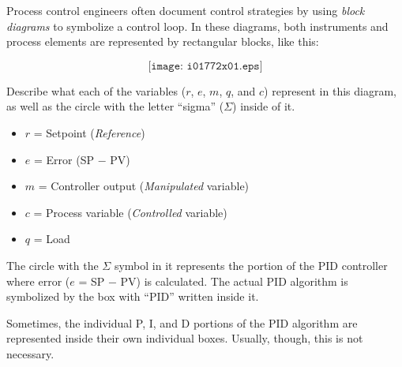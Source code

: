 

Process control engineers often document control strategies by using {\it block diagrams} to symbolize a control loop.  In these diagrams, both instruments and process elements are represented by rectangular blocks, like this:

$$\texttt{[image: i01772x01.eps]}$$

Describe what each of the variables ($r$, $e$, $m$, $q$, and $c$) represent in this diagram, as well as the circle with the letter ``sigma'' ($\Sigma$) inside of it.







\begin{itemize}
\item{} $r$ = Setpoint ({\it Reference})
\item{} $e$ = Error (SP $-$ PV)
\item{} $m$ = Controller output ({\it Manipulated} variable)
\item{} $c$ = Process variable ({\it Controlled} variable)
\item{} $q$ = Load
\end{itemize} 
 
The circle with the $\Sigma$ symbol in it represents the portion of the PID controller where error ($e$ = SP $-$ PV) is calculated.  The actual PID algorithm is symbolized by the box with ``PID'' written inside it.







Sometimes, the individual P, I, and D portions of the PID algorithm are represented inside their own individual boxes.  Usually, though, this is not necessary.




